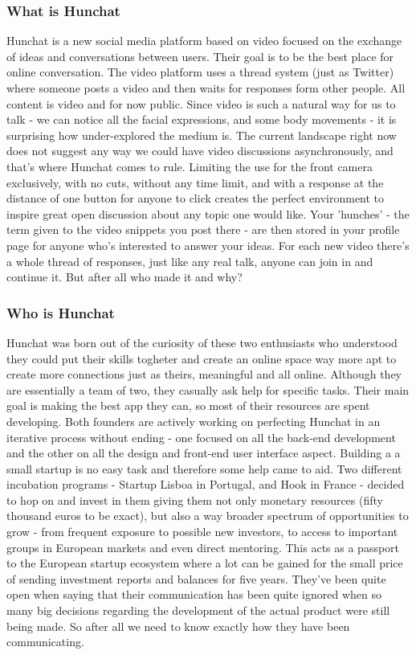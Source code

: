 \documentclass[12pt]{article}
\begin{document}
	\subsubsection{What is Hunchat}
Hunchat is a new social media platform based on video focused on the exchange of ideas and conversations between users. Their goal is to be the best place for online conversation. The video platform uses a thread system (just as Twitter) where someone posts a video and then waits for responses form other people. All content is video and for now public. Since video is such a natural way for us to talk - we can notice all the facial expressions, and some body movements - it is surprising how under-explored the medium is. The current landscape right now does not suggest any way we could have video discussions asynchronously, and that's where Hunchat comes to rule. Limiting the use for the front camera exclusively, with no cuts, without any time limit, and with a response at the distance of one button for anyone to click creates the perfect environment to inspire great open discussion about any topic one would like. Your 'hunches' - the term given to the video snippets you post there - are then stored in your profile page for anyone who's interested to answer your ideas. For each new video there's a whole thread of responses, just like any real talk, anyone can join in and continue it. But after all who made it and why?

	\subsubsection{Who is Hunchat}
Hunchat was born out of the curiosity of these two enthusiasts who understood they could put their skills togheter and create an online space way more apt to create more connections just as theirs, meaningful and all online. Although they are essentially a team of two, they casually ask help for specific tasks. Their main goal is making the best app they can, so most of their resources are spent developing. Both founders are actively working on perfecting Hunchat in an iterative process without ending - one focused on all the back-end development and the other on all the design and front-end user interface aspect. Building a a small startup is no easy task and therefore some help came to aid. Two different incubation programs - Startup Lisboa in Portugal, and Hook in France - decided to hop on and invest in them giving them not only monetary resources (fifty thousand euros to be exact), but also a way broader spectrum of opportunities to grow - from frequent exposure to possible new investors, to access to important groups in European markets and even direct mentoring. This acts as a passport to the European startup ecosystem where a lot can be gained for the small price of sending investment reports and balances for five years. They've been quite open when saying that their communication has been quite ignored when so many big decisions regarding the development of the actual product were still being made. So after all we need to know exactly how they have been communicating. 
\end{document}
